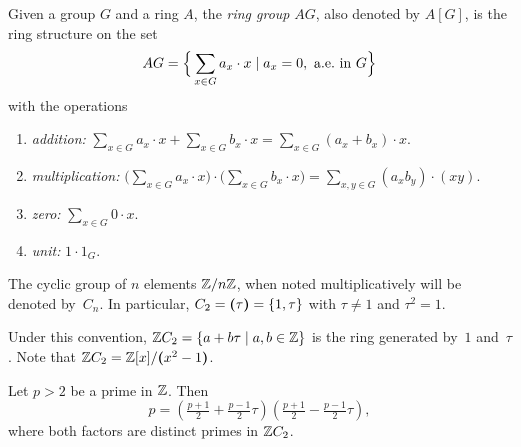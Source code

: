 \begin{defn}
    Given a group $G$ and a ring $A$, the \textsl{ring group} $AG$, also denoted by $A[G]$, is the ring structure on the set
    $$
        AG = \Big\{\sum_{x\in G}a_x\cdot x\mid a_x=0\aew[G]\Big\}
    $$
    with the operations
    \begin{enumerate}[-]
        \item \textit{addition:} $\sum_{x\in G}a_x \cdot x
            + \sum_{x\in G} b_x\cdot x
            = \sum_{x\in G}(a_x+b_x)\cdot x$.
        \item \textit{multiplication:} $\big(\sum_{x\in G}a_x\cdot x\big)
            \cdot\big(\sum_{x\in G}b_x\cdot x\big)
            =\sum_{x,y\in G}(a_xb_y) \cdot(xy)$.
        \item \textit{zero:} $\sum_{x\in G}0\cdot x$.
        \item \textit{unit:} $1\cdot1_G$.
    \end{enumerate}
\end{defn}
    

\begin{ntn}
    The cyclic group of\/ $n$ elements\/ $\mathbb{Z}/n\mathbb{Z}$, when noted multiplicatively will be denoted by\/~$C_n$. In particular, $C_2=\textrm{\boldmath$($}\tau\textrm{\boldmath$)$}=\{1,\tau\}$ with\/ $\tau\ne1$ and\/ $\tau^2=1$.

    Under this convention, $\mathbb{Z} C_2=\{a+b\tau\mid a,b\in\mathbb{Z}\}$ is the ring generated by~$1$ and~$\tau$. Note that\/ $\mathbb{Z} C_2=\mathbb{Z}[x]/\textrm{\boldmath$($}x^2-1\textrm{\boldmath$)$}$.
\end{ntn}

\begin{prop}
    Let $p>2$ be a prime in $\mathbb{Z}$. Then
    $$
        p = (\tfrac{p+1}2 + \tfrac{p-1}2\tau)
            (\tfrac{p+1}2 - \tfrac{p-1}2\tau),
    $$
    where both factors are distinct primes in $\mathbb{Z} C_2$.
\end{prop}

